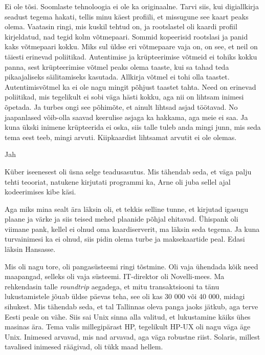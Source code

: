 Ei ole tõsi. Soomlaste tehnoloogia ei ole ka originaalne. Tarvi siis, kui  
digiallkirja seadust tegema hakati, tellis minu käest profiili, et missugune 
see kaart peaks olema. Vaatasin ringi, mis kuskil tehtud on, ja rootslastel oli 
kaardi profiil kirjeldatud, nad tegid kolm võtmepaari. Sommid kopeerisid 
rootslasi ja panid kaks võtmepaari kokku. Miks sul üldse eri võtmepaare vaja 
on, on see, et neil on täiesti erinevad poliitikad. Autentimise ja 
krüpteerimise võtmeid ei tohiks kokku panna, sest krüpteerimise võtmel  peaks 
olema taaste, kui sa tahad teda pikaajaliseks säilitamiseks kasutada. Allkirja võtmel ei tohi olla taastet. 
Autentimisvõtmel ka ei ole nagu mingit põhjust taastet tahta. Need on erinevad 
poliitikad, mis tegelikult ei sobi väga hästi kokku, aga nii on lihtsam inimesi 
õpetada. Ja turbes ongi see põhimõte, et ainult lihtsad asjad töötavad. No 
jaapanlased võib-olla saavad keerulise asjaga ka hakkama, aga meie ei saa. Ja 
kuna ükski inimene krüpteerida ei oska, siis talle tuleb anda mingi junn, mis 
seda tema eest teeb, mingi arvuti. Kiipkaardist lihtsamat arvutit ei ole olemas.
     

Jah

            
Küber iseenesest oli üsna selge teadusasutus. Mis tähendab seda, et väga palju 
tehti teooriat, natukene kirjutati programmi ka, Arne oli juba sellel ajal kodeerimises kibe käsi.

Aga miks mina sealt ära läksin oli, et tekkis selline tunne, et kirjutad 
igasugu plaane ja värke ja siis teised mehed plaanide põhjal ehitavad. 
Ühispank oli viimane pank, kellel ei olnud oma kaardiserverit, ma läksin seda 
tegema. Ja kuna turvainimesi ka ei olnud, siis pidin olema turbe ja 
maksekaartide peal. Edasi läksin Hansasse. 

Mis oli nagu tore, oli pangasüsteemi ringi tõstmine. Oli vaja ühendada kõik 
need maapangad, selleks oli vaja süsteemi. IT-direktor oli 
Novelli-mees. Ma rehkendasin talle \emph{roundtrip} aegadega, et mitu 
transaktsiooni ta tänu lukustamistele jõuab üldse päevas teha, see oli kas 30 
000 või 40 000, midagi sihukest. Mis tähendab seda, et tal Tallinnas oleva 
panga jaoks jätkub, aga terve Eesti peale on vähe. Siis sai Unix sinna alla 
valitud, et lukustamine käiks ühes masinas ära. Tema valis millegipärast HP, 
tegelikult HP-UX oli nagu väga äge Unix. Inimesed arvavad, mis 
nad arvavad, aga väga robustne riist. Solaris, millest tavalised inimesed 
räägivad, oli tükk maad hellem. 

